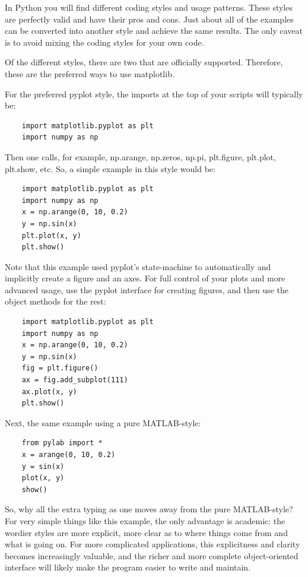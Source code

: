 In Python you will find different coding styles and usage patterns. These styles are perfectly valid and have their pros and cons. Just about all of the examples can be converted into another style and achieve the same results. The only caveat is to avoid mixing the coding styles for your own code.

Of the different styles, there are two that are officially supported. Therefore, these are the preferred ways to use matplotlib.

For the preferred pyplot style, the imports at the top of your scripts will typically be:

\begin{lstlisting}
    import matplotlib.pyplot as plt
    import numpy as np
\end{lstlisting}

Then one calls, for example, np.arange, np.zeros, np.pi, plt.figure, plt.plot, plt.show, etc. So, a simple example in this style would be:

\begin{lstlisting}
    import matplotlib.pyplot as plt
    import numpy as np
    x = np.arange(0, 10, 0.2)
    y = np.sin(x)
    plt.plot(x, y)
    plt.show()
\end{lstlisting}

Note that this example used pyplot's state-machine to automatically and implicitly create a figure and an axes. For full control of your plots and more advanced usage, use the pyplot interface for creating figures, and then use the object methods for the rest:

\begin{lstlisting}
    import matplotlib.pyplot as plt
    import numpy as np
    x = np.arange(0, 10, 0.2)
    y = np.sin(x)
    fig = plt.figure()
    ax = fig.add_subplot(111)
    ax.plot(x, y)
    plt.show()
\end{lstlisting}

Next, the same example using a pure MATLAB-style:

\begin{lstlisting}
    from pylab import *
    x = arange(0, 10, 0.2)
    y = sin(x)
    plot(x, y)
    show()
\end{lstlisting}

So, why all the extra typing as one moves away from the pure MATLAB-style? For very simple things like this example, the only advantage is academic: the wordier styles are more explicit, more clear as to where things come from and what is going on. For more complicated applications, this explicitness and clarity becomes increasingly valuable, and the richer and more complete object-oriented interface will likely make the program easier to write and maintain.

